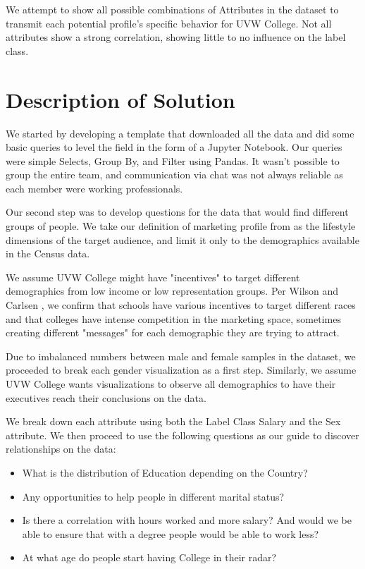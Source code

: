 \documentclass{IEEEtran}
\begin{document}
We attempt to show all possible combinations of Attributes in the dataset to transmit each potential profile's specific behavior for UVW College. Not all attributes show a strong correlation, showing little to no influence on the label class. 

\section{Description of Solution}


We started by developing a template that downloaded all the data and did some basic queries to level the field in the form of a Jupyter Notebook. Our queries were simple Selects, Group By, and Filter using Pandas. It wasn't possible to group the entire team, and communication via chat was not always reliable as each member were working professionals. 

Our second step was to develop questions for the data that would find different groups of people. We take our definition of marketing profile from \cite{perreault2002basic} as the lifestyle dimensions of the target audience, and limit it only to the demographics available in the Census data. 

We assume UVW College might have "incentives" to target different demographics from low income or low representation groups. Per Wilson and Carlsen \cite{wilson2016school}, we confirm that schools have various incentives to target different races and that colleges have intense competition in the marketing space, sometimes creating different "messages" for each demographic they are trying to attract.

Due to imbalanced numbers between male and female samples in the dataset, we proceeded to break each gender visualization as a first step. Similarly, we assume UVW College wants visualizations to observe all demographics to have their executives reach their conclusions on the data. 

We break down each attribute using both the Label Class Salary and the Sex attribute. We then proceed to use the following questions as our guide to discover relationships on the data:

\begin{itemize}
  \item What is the distribution of Education depending on the Country? 
  \item Any opportunities to help people in different marital status?
  \item Is there a correlation with hours worked and more salary? And would we be able to ensure that with a degree people would be able to work less?
  \item At what age do people start having College in their radar?
\end{itemize}
\end{document}
